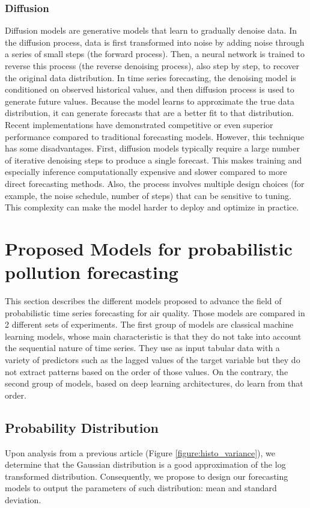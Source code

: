 \documentclass[12pt,a4paper]{book}
\begin{document}
\subsection{Diffusion}
Diffusion models \citep{diftimemeijer_rise_2024} are generative models that learn to gradually denoise data. In the diffusion process, data is first transformed into noise by adding noise through a series of small steps (the forward process). Then, a neural network is trained to reverse this process (the reverse denoising process), also step by step, to recover the original data distribution. In time series forecasting, the denoising model is conditioned on observed historical values, and then diffusion process is used to generate future values. Because the model learns to approximate the true data distribution, it can generate forecasts that are a better fit to that distribution. Recent implementations \citep{diftimemeijer_rise_2024} have demonstrated competitive or even superior performance compared to traditional forecasting models. However, this technique has some disadvantages. First, diffusion models typically require a large number of iterative denoising steps to produce a single forecast. This makes training and especially inference computationally expensive and slower compared to more direct forecasting methods. Also, the process involves multiple design choices (for example, the noise schedule, number of steps) that can be sensitive to tuning. This complexity can make the model harder to deploy and optimize in practice.

\chapter{Proposed Models for probabilistic pollution forecasting} 
\label{sec:proposemodel}
This section describes the different models proposed to advance the field of probabilistic time series forecasting for air quality. Those models are compared in 2 different sets of experiments. The first group of models are classical machine learning models, whose main characteristic is that they do not take into account the sequential nature of time series. They use as input tabular data with a variety of predictors such as the lagged values of the target variable but they do not extract patterns based on the order of those values. On the contrary, the second group of models, based on deep learning architectures, do learn from that order.

\section{\no{} Probability Distribution}
Upon analysis from a previous article \citep{vasseur_comparing_2021} (Figure \ref{figure:histo_variance}), we determine that the Gaussian distribution is a good approximation of the log transformed \no{} distribution. Consequently, we propose to design our forecasting models to output the parameters of such distribution: mean and standard deviation.
\end{document}
